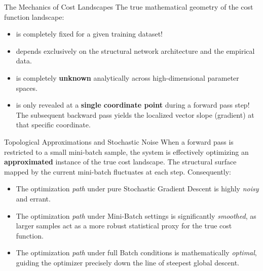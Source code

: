 \begin{frame}{The Mechanics of Cost Landscapes}
	The true mathematical geometry of the cost function landscape:
	\begin{itemize}
		\item is completely fixed for a given training dataset!
		\pause
		\item depends exclusively on the structural network architecture and the empirical data.
		\pause
		\item is completely \textbf{unknown} analytically across high-dimensional parameter spaces.
		\pause
		\item is only revealed at a \textbf{single coordinate point} during a forward pass step! The subsequent backward pass yields the localized vector slope (gradient) at that specific coordinate.
	\end{itemize}
\end{frame}

\begin{frame}{Topological Approximations and Stochastic Noise}
	When a forward pass is restricted to a small mini-batch sample, the system is effectively optimizing an \textbf{approximated} instance of the true cost landscape. The structural surface mapped by the current mini-batch fluctuates at each step. Consequently:
	\begin{itemize}
		\item The optimization \textit{path} under pure Stochastic Gradient Descent is highly \textit{noisy} and errant.
		\item The optimization \textit{path} under Mini-Batch settings is significantly \textit{smoothed}, as larger samples act as a more robust statistical proxy for the true cost function.
		\item The optimization \textit{path} under full Batch conditions is mathematically \textit{optimal}, guiding the optimizer precisely down the line of steepest global descent.
	\end{itemize}
\end{frame}

